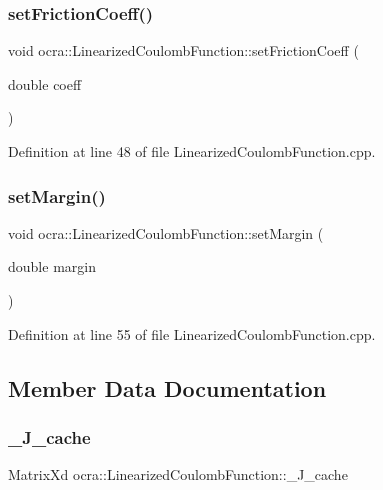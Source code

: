 \subsubsection{\texorpdfstring{set\+Friction\+Coeff()}{setFrictionCoeff()}}
{\footnotesize\ttfamily void ocra\+::\+Linearized\+Coulomb\+Function\+::set\+Friction\+Coeff (\begin{DoxyParamCaption}\item[{double}]{coeff }\end{DoxyParamCaption})}



Definition at line 48 of file Linearized\+Coulomb\+Function.\+cpp.

\hypertarget{classocra_1_1LinearizedCoulombFunction_ae220b1da32667c6ba6125af02a170113}{}\label{classocra_1_1LinearizedCoulombFunction_ae220b1da32667c6ba6125af02a170113} 
\subsubsection{\texorpdfstring{set\+Margin()}{setMargin()}}
{\footnotesize\ttfamily void ocra\+::\+Linearized\+Coulomb\+Function\+::set\+Margin (\begin{DoxyParamCaption}\item[{double}]{margin }\end{DoxyParamCaption})}



Definition at line 55 of file Linearized\+Coulomb\+Function.\+cpp.



\subsection{Member Data Documentation}
\hypertarget{classocra_1_1LinearizedCoulombFunction_aa94e64532f28678c15ff1696f7c25684}{}\label{classocra_1_1LinearizedCoulombFunction_aa94e64532f28678c15ff1696f7c25684} 
\subsubsection{\texorpdfstring{\+\_\+\+J\+\_\+cache}{\_J\_cache}}
{\footnotesize\ttfamily Matrix\+Xd ocra\+::\+Linearized\+Coulomb\+Function\+::\+\_\+\+J\+\_\+cache\hspace{0.3cm}{\ttfamily [protected]}}




